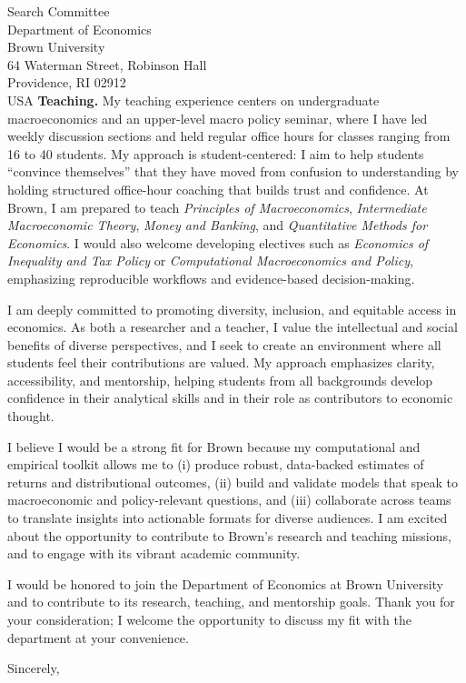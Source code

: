 \documentclass[11pt,letterpaper]{letter}
\begin{document}
\begin{letter}{Search Committee \\
Department of Economics \\
Brown University \\
64 Waterman Street, Robinson Hall \\
Providence, RI 02912 \\ USA}
\textbf{Teaching.} My teaching experience centers on undergraduate macroeconomics and an upper-level macro policy seminar, where I have led weekly discussion sections and held regular office hours for classes ranging from 16 to 40 students. My approach is student-centered: I aim to help students “convince themselves” that they have moved from confusion to understanding by holding structured office-hour coaching that builds trust and confidence. At Brown, I am prepared to teach \textit{Principles of Macroeconomics}, \textit{Intermediate Macroeconomic Theory}, \textit{Money and Banking}, and \textit{Quantitative Methods for Economics}. I would also welcome developing electives such as \textit{Economics of Inequality and Tax Policy} or \textit{Computational Macroeconomics and Policy}, emphasizing reproducible workflows and evidence-based decision-making.

I am deeply committed to promoting diversity, inclusion, and equitable access in economics. As both a researcher and a teacher, I value the intellectual and social benefits of diverse perspectives, and I seek to create an environment where all students feel their contributions are valued. My approach emphasizes clarity, accessibility, and mentorship, helping students from all backgrounds develop confidence in their analytical skills and in their role as contributors to economic thought.

I believe I would be a strong fit for Brown because my computational and empirical toolkit allows me to (i) produce robust, data-backed estimates of returns and distributional outcomes, (ii) build and validate models that speak to macroeconomic and policy-relevant questions, and (iii) collaborate across teams to translate insights into actionable formats for diverse audiences. I am excited about the opportunity to contribute to Brown’s research and teaching missions, and to engage with its vibrant academic community.

I would be honored to join the Department of Economics at Brown University and to contribute to its research, teaching, and mentorship goals. Thank you for your consideration; I welcome the opportunity to discuss my fit with the department at your convenience.

\closing{Sincerely,}

\end{letter}
\end{document}
